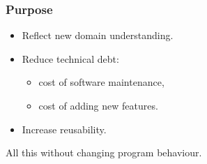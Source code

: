 \begin{frame}

\frametitle{Purpose}

\vspace{\fill}

\begin{itemize}

\item Reflect new domain understanding.

\item Reduce technical debt:

\begin{itemize}

\item cost of software maintenance,

\item cost of adding new features.

\end{itemize}

\item Increase reusability.

\end{itemize}

\vspace{\fill}

\begin{center}

All this without changing program behaviour.

\end{center}

\vspace{\fill}

\end{frame}
